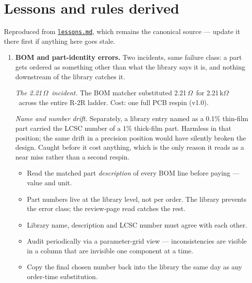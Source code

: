 \documentclass[11pt,a4paper]{article}
\newcommand{\ohm}{\ensuremath{\Omega}}
\newcommand{\doc}[1]{\href{https://github.com/Lambros25/Function-Generator/blob/main/docs/#1}{\texttt{#1}}}
\begin{document}
\section{Lessons and rules derived}
\label{sec:lessons}

Reproduced from \doc{lessons.md}, which remains the canonical source --- update it there
first if anything here goes stale.

\begin{enumerate}[label=\textbf{\arabic*.},leftmargin=2.1em]
    \item \textbf{BOM and part-identity errors.} Two incidents, same failure class: a part
          gets ordered as something other than what the library says it is, and nothing
          downstream of the library catches it.

          \emph{The 2.21\,\ohm\ incident.} The BOM matcher substituted 2.21\,\ohm\ for
          2.21\,k\ohm\ across the entire R-2R ladder. Cost: one full PCB respin (v1.0).

          \emph{Name and number drift.} Separately, a library entry named as a 0.1\%
          thin-film part carried the LCSC number of a 1\% thick-film part. Harmless in that
          position; the same drift in a precision position would have silently broken the
          design. Caught before it cost anything, which is the only reason it reads as a
          near miss rather than a second respin.
          \begin{itemize}[topsep=0.4em,itemsep=0.35em]
              \item Read the matched part \emph{description} of every BOM line before paying ---
                    value and unit.
              \item Part numbers live at the library level, not per order. The library prevents the
                    error class; the review-page read catches the rest.
              \item Library name, description and LCSC number must agree with each other.
              \item Audit periodically via a parameter-grid view --- inconsistencies are visible in
                    a column that are invisible one component at a time.
              \item Copy the final chosen number back into the library the same day as any
                    order-time substitution.
          \end{itemize}


\end{enumerate}
\end{document}

